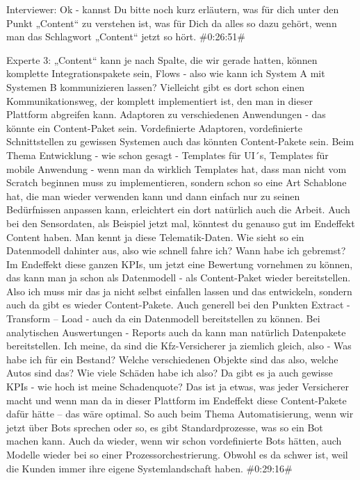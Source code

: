 Interviewer:
Ok - kannst Du bitte noch kurz erläutern, was für dich unter den Punkt „Content“ zu verstehen ist, was für Dich da alles so dazu gehört, wenn man das Schlagwort „Content“ jetzt so hört.
\#0:26:51\#

Experte 3:
„Content“ kann je nach Spalte, die wir gerade hatten, können komplette Integrationspakete sein, Flows - also wie kann ich System A mit Systemen B kommunizieren lassen? Vielleicht gibt es dort schon einen Kommunikationsweg, der komplett implementiert ist, den man in dieser Plattform abgreifen kann. Adaptoren zu verschiedenen Anwendungen - das könnte ein Content-Paket sein. Vordefinierte Adaptoren, vordefinierte Schnittstellen zu gewissen Systemen auch das könnten Content-Pakete sein. Beim Thema Entwicklung - wie schon gesagt - Templates für UI´s, Templates für mobile Anwendung - wenn man da wirklich Templates hat, dass man nicht vom Scratch beginnen muss zu implementieren, sondern schon so eine Art Schablone hat, die man wieder verwenden kann und dann einfach nur zu seinen Bedürfnissen anpassen kann, erleichtert ein dort natürlich auch die Arbeit. Auch bei den Sensordaten, als Beispiel jetzt mal, könntest du genauso gut im Endeffekt Content haben. Man kennt ja diese Telematik-Daten. Wie sieht so ein Datenmodell dahinter aus, also wie schnell fahre ich? Wann habe ich gebremst? Im Endeffekt diese ganzen KPIs, um jetzt eine Bewertung vornehmen zu können, das kann man ja schon als Datenmodell - als Content-Paket wieder bereitstellen. Also ich muss mir das ja nicht selbst einfallen lassen und das entwickeln, sondern auch da gibt es wieder Content-Pakete. Auch generell bei den Punkten Extract - Transform – Load - auch da ein Datenmodell bereitstellen zu können. Bei analytischen Auswertungen - Reports auch da kann man natürlich Datenpakete bereitstellen. Ich meine, da sind die Kfz-Versicherer ja ziemlich gleich, also - Was habe ich für ein Bestand? Welche verschiedenen Objekte sind das also, welche Autos sind das? Wie viele Schäden habe ich also? Da gibt es ja auch gewisse KPIs - wie hoch ist meine Schadenquote? Das ist ja etwas, was jeder Versicherer macht und wenn man da in dieser Plattform im Endeffekt diese Content-Pakete dafür hätte – das wäre optimal. So auch beim Thema Automatisierung, wenn wir jetzt über Bots sprechen oder so, es gibt Standardprozesse, was so ein Bot machen kann. Auch da wieder, wenn wir schon vordefinierte Bots hätten, auch Modelle wieder bei so einer Prozessorchestrierung. Obwohl es da schwer ist, weil die Kunden immer ihre eigene Systemlandschaft haben. 
\#0:29:16\#

